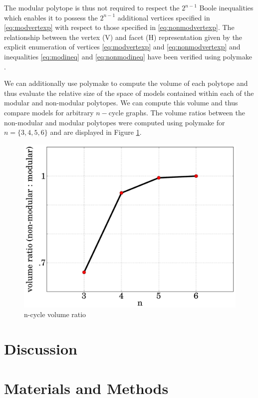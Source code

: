 \documentclass[10pt]{article}
\begin{document}
The modular polytope is thus not required to respect the $2^{n-1}$ Boole inequalities which enables it to possess the $2^{n-1}$ additional vertices specified in \ref{eq:modvertexp} with respect to those specified in \ref{eq:nonmodvertexp}. The relationship between the vertex (V) and facet (H) representation given by the explicit enumeration of vertices \ref{eq:modvertexp} and \ref{eq:nonmodvertexp} and inequalities \ref{eq:modineq} and \ref{eq:nonmodineq} have been verified using polymake \cite{GawrilowEwgenijD-TJoswig2000}. 

We can additionally use polymake to compute the volume of each polytope and thus evaluate the relative size of the space of models contained within each of the modular and non-modular polytopes. We can compute this volume and thus compare models for arbitrary $n-$cycle graphs. The volume ratios between the non-modular and modular polytopes were computed using polymake for $n=\{3,4,5,6\}$ and are displayed in Figure \ref{fig:ncycvolrat}.

\begin{figure}
\begin{center}
\noindent\includegraphics[width=0.6\columnwidth]{fig/ncycvolrat.pdf}
\end{center}
\caption{n-cycle volume ratio}
\label{fig:ncycvolrat}
\end{figure}


\section*{Discussion}

\section*{Materials and Methods}
\end{document}
